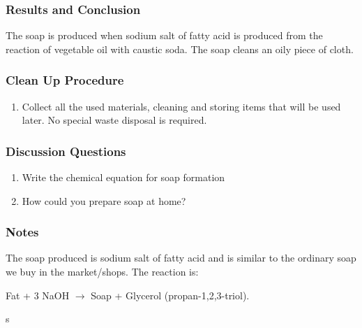 \subsubsection*{Results and Conclusion}
The soap is produced when sodium salt of fatty acid is produced from the reaction of vegetable oil with caustic soda. The soap cleans an oily piece of cloth.

\subsubsection*{Clean Up Procedure}
\begin{enumerate}
\item{Collect all the used materials, cleaning and storing items that will be used later. No special waste disposal is required.}
\end{enumerate}

\subsubsection*{Discussion Questions}
\begin{enumerate}
\item{Write the chemical equation for soap formation}
\item{How could you prepare soap at home?}
\end{enumerate}

\subsubsection*{Notes}
The soap produced is sodium salt of fatty acid and is similar to the ordinary soap we buy in the market/shops.
The reaction is:

Fat  +  3 NaOH  $\longrightarrow$ Soap  +  Glycerol (propan-1,2,3-triol).

s
